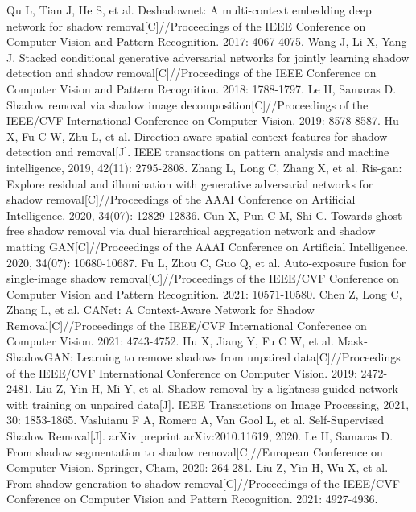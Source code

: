 \documentclass[journal]{IEEEtran}
\begin{document}
\begin{thebibliography}{99}

Qu L, Tian J, He S, et al. Deshadownet: A multi-context embedding deep network for shadow removal[C]//Proceedings of the IEEE Conference on Computer Vision and Pattern Recognition. 2017: 4067-4075.
Wang J, Li X, Yang J. Stacked conditional generative adversarial networks for jointly learning shadow detection and shadow removal[C]//Proceedings of the IEEE Conference on Computer Vision and Pattern Recognition. 2018: 1788-1797.
Le H, Samaras D. Shadow removal via shadow image decomposition[C]//Proceedings of the IEEE/CVF International Conference on Computer Vision. 2019: 8578-8587.
Hu X, Fu C W, Zhu L, et al. Direction-aware spatial context features for shadow detection and removal[J]. IEEE transactions on pattern analysis and machine intelligence, 2019, 42(11): 2795-2808.
Zhang L, Long C, Zhang X, et al. Ris-gan: Explore residual and illumination with generative adversarial networks for shadow removal[C]//Proceedings of the AAAI Conference on Artificial Intelligence. 2020, 34(07): 12829-12836.
Cun X, Pun C M, Shi C. Towards ghost-free shadow removal via dual hierarchical aggregation network and shadow matting GAN[C]//Proceedings of the AAAI Conference on Artificial Intelligence. 2020, 34(07): 10680-10687.
Fu L, Zhou C, Guo Q, et al. Auto-exposure fusion for single-image shadow removal[C]//Proceedings of the IEEE/CVF Conference on Computer Vision and Pattern Recognition. 2021: 10571-10580.
Chen Z, Long C, Zhang L, et al. CANet: A Context-Aware Network for Shadow Removal[C]//Proceedings of the IEEE/CVF International Conference on Computer Vision. 2021: 4743-4752.
Hu X, Jiang Y, Fu C W, et al. Mask-ShadowGAN: Learning to remove shadows from unpaired data[C]//Proceedings of the IEEE/CVF International Conference on Computer Vision. 2019: 2472-2481.
Liu Z, Yin H, Mi Y, et al. Shadow removal by a lightness-guided network with training on unpaired data[J]. IEEE Transactions on Image Processing, 2021, 30: 1853-1865.
Vasluianu F A, Romero A, Van Gool L, et al. Self-Supervised Shadow Removal[J]. arXiv preprint arXiv:2010.11619, 2020.
Le H, Samaras D. From shadow segmentation to shadow removal[C]//European Conference on Computer Vision. Springer, Cham, 2020: 264-281.
Liu Z, Yin H, Wu X, et al. From shadow generation to shadow removal[C]//Proceedings of the IEEE/CVF Conference on Computer Vision and Pattern Recognition. 2021: 4927-4936.

\end{thebibliography}
\end{document}
